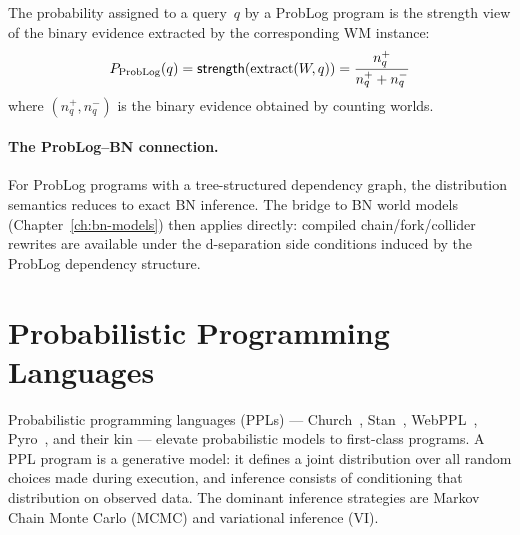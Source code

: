 \begin{proposition}
\label{prop:problog-view}
The probability assigned to a query~$q$ by a ProbLog program is the
strength view of the binary evidence extracted by the corresponding
WM instance:
\[
  P_{\mathrm{ProbLog}}(q) = \mathsf{strength}(\mathrm{extract}(W, q))
  = \frac{n_q^+}{n_q^+ + n_q^-}
\]
where $(n_q^+, n_q^-)$ is the binary evidence obtained by counting
worlds.
\end{proposition}

\paragraph{The ProbLog--BN connection.}
For ProbLog programs with a tree-structured dependency graph, the
distribution semantics reduces to exact BN inference.  The bridge
to BN world models (Chapter~\ref{ch:bn-models}) then applies
directly: compiled chain/fork/collider rewrites are available under
the d-separation side conditions induced by the ProbLog dependency
structure.



\section{Probabilistic Programming Languages}
\label{sec:bridge-ppl}

Probabilistic programming languages (PPLs) --- Church~\cite{Goodman2008Church},
Stan~\cite{Carpenter2017Stan}, WebPPL~\cite{Goodman2014WebPPL},
Pyro~\cite{Bingham2019Pyro}, and their kin --- elevate probabilistic
models to first-class programs.  A PPL program is a generative model:
it defines a joint distribution over all random choices made during
execution, and inference consists of conditioning that distribution on
observed data.  The dominant inference strategies are Markov Chain Monte
Carlo (MCMC) and variational inference (VI).

